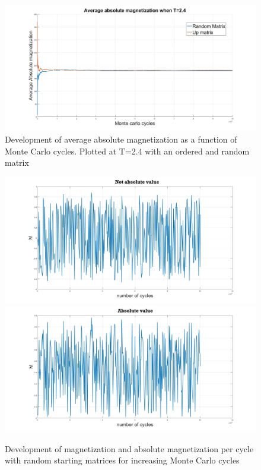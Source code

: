 \documentclass[10pt,a4paper]{article}
\begin{document}
\begin{figure} [H]
\centerline{
\includegraphics[scale=0.3]{avgMagn24.jpg}
}
\caption{Development of average absolute magnetization as a function of Monte Carlo cycles. Plotted at T=2.4 with an ordered and random matrix}
\label{fig:AverageMagn24}
\end{figure}

\begin{figure} [H]
\centerline{
\includegraphics[scale=0.15]{RANDOMmag24notabs.jpg}
\includegraphics[scale=0.15]{RANDOMmag24abs.jpg}
}
\caption{Development of magnetization and absolute magnetization per cycle with random starting matrices for increasing Monte Carlo cycles}
\label{fig:RandomMag24}
\end{figure}
\end{document}
